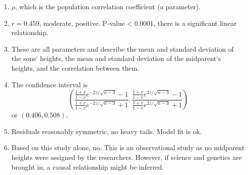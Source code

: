 \begin{enumerate}
\item $\rho$, which is the population correlation coefficient (a parameter).
\item $r=0.459$, moderate, positive.  P-value < 0.0001, there is a significant linear relationship.
\item These are all parameters and describe the mean and standard deviation of the sons` heights, the mean and standard deviation of the midparent`s heights, and the correlation between them.
\item The confidence interval is 
$$ \left(\frac{\frac{1+r}{1-r}e^{-2z/\sqrt{n-3}}-1}{\frac{1+r}{1-r}e^{-2z/\sqrt{n-3}}+1}, 
\frac{\frac{1+r}{1-r}e^{2z/\sqrt{n-3}}-1}{\frac{1+r}{1-r}e^{2z/\sqrt{n-3}}+1}\right)$$
or $(0.406,0.508)$.
\item Residuals reasonably symmetric, no heavy tails.  Model fit is ok.
\item Based on this study alone, no.  This is an observational study as no midparent heights were assigned by the researchers.  However, if science and genetics are brought in, a causal relationship might be inferred.
\end{enumerate}

\newpage

